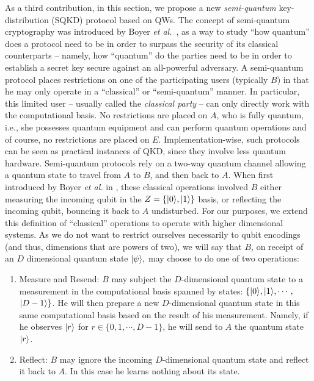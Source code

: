 As a third contribution, in this section, we propose a new \emph{semi-quantum} key-distribution (SQKD) protocol based on QWs.  The concept of semi-quantum cryptography was introduced by Boyer {\em et al.}~\cite{boy:ken:mor:07,boy:gel:ken:mor:09}, as a way to study ``how quantum'' does a protocol need to be in order to surpass the security of its classical counterparts -- namely, how ``quantum'' do the parties need to be in order to establish a secret key secure against an all-powerful adversary.  A semi-quantum protocol places restrictions on one of the participating users (typically $B$) in that he may only operate in a ``classical'' or ``semi-quantum'' manner. In particular, this limited user -- usually called the {\em classical party} -- can only directly work with the computational basis.  No restrictions are placed on $A$, who is fully quantum, i.e., she possesses quantum equipment and can perform quantum operations and of course, no restrictions are placed on $E$. Implementation-wise, such protocols can be seen as practical instances of QKD, since they involve less quantum hardware. 
 Semi-quantum protocols rely on a two-way quantum channel allowing a quantum state to travel from $A$ to $B$, and then back to $A$.  When first introduced by Boyer {\em et al.} in \cite{boy:ken:mor:07}, these classical operations involved $B$ either measuring the incoming qubit in the $Z = \{| 0 \rangle, | 1 \rangle\}$ basis, or reflecting the incoming qubit, bouncing it back to $A$ undisturbed.  For our purposes, we extend this definition of ``classical'' operations to operate with higher dimensional systems.  As we do not want to restrict ourselves necessarily to qubit encodings (and thus, dimensions that are powers of two), we will say that $B$, on receipt of an $D$ dimensional quantum state $| \psi \rangle,$ may choose to do one of two operations:
\begin{enumerate}
  \item Measure and Resend: $B$ may subject the $D$-dimensional quantum state to a measurement in the computational basis spanned by states: $\{| 0 \rangle, | 1 \rangle, \cdots,$ $ | D-1 \rangle\}$.  He will then prepare a new $D$-dimensional quantum state in this same computational basis based on the result of his measurement.  Namely, if he observes $| r \rangle$ for $r \in \{0, 1, \cdots, D-1\}$, he will send to $A$ the quantum state $| r \rangle$.
  \item Reflect: $B$ may ignore the incoming $D$-dimensional quantum state and reflect it back to $A$.  In this case he learns nothing about its state.
\end{enumerate}


